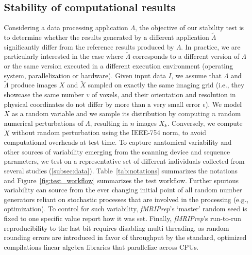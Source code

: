 \documentclass[lettersize,journal]{IEEEtran}
\newcommand{\fmriprep}{\emph{fMRIPrep}\xspace}
\begin{document}
\subsection{Stability of computational results}

Considering a data processing application $\Lambda$, the objective of our stability test is to determine whether the results generated by a different application $\tilde \Lambda$ significantly differ from the reference results produced by $\Lambda$. In practice, we are particularly interested in the case where $\tilde \Lambda$ corresponds to a different version of $\Lambda$ or the same version executed in a different execution environment (operating system, parallelization or hardware). Given input data $I$, we assume that $\Lambda$ and $\tilde \Lambda$ produce images $X$ and $\tilde X$ sampled on exactly the same imaging grid (i.e., they showcase the same number $v$ of voxels, and their orientation and resolution in physical coordinates do not differ by more than a very small error $\epsilon$).
We model $X$ as a random variable and we sample its distribution by computing $n$ random numerical perturbations of $\Lambda$, resulting in $n$ images $X_k$. Conversely, we compute $\tilde X$ without random perturbation using the
  IEEE-754 norm, %
  to avoid computational overheads at test time.
To capture anatomical variability and other sources of variability emerging from the scanning device and sequence parameters,
  we test on a representative set of different individuals collected from several studies (\autoref{subsec:data}).
Table~\ref{tab:notations} summarizes the notations and Figure~\ref{fig:test_workflow} summarizes the test workflow.
Further spurious variability can source from the ever changing initial point of all random number generators
  reliant on stochastic processes that are involved in the processing (e.g., optimization).
To control for such variability, \fmriprep's `master' random seed is fixed to one specific value
  {\color{red} report how it was set}.
Finally, \fmriprep's run-to-run reproducibility to the last bit requires disabling multi-threading, as
  random rounding errors are introduced in favor of throughput by the standard, optimized compilations
  linear algebra libraries that parallelize across CPUs.
\end{document}
